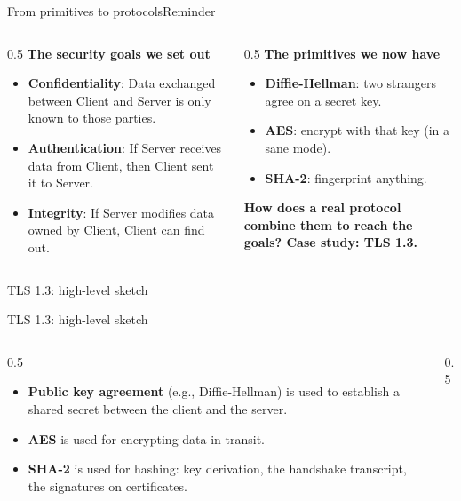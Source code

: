 \ifdefined\PRESENTATION\else\PassOptionsToClass{handout}{beamer}\fi\documentclass[aspectratio=169, lualatex]{beamer}
\begin{document}
\begin{frame}{From primitives to protocols}{Reminder}
	\begin{columns}[c]
		\begin{column}{0.5\textwidth}
			\textbf{The security goals we set out}
			\begin{itemize}
				\item \textbf{Confidentiality}: Data exchanged between Client and Server
				      is only known to those parties.
				\item \textbf{Authentication}: If Server receives data from Client,
				      then Client sent it to Server.
				\item \textbf{Integrity}: If Server modifies data owned by Client,
				      Client can find out.
			\end{itemize}
		\end{column}
		\begin{column}{0.5\textwidth}
			\textbf{The primitives we now have}
			\begin{itemize}
				\item \textbf{Diffie-Hellman}: two strangers agree on a secret key.
				\item \textbf{AES}: encrypt with that key (in a sane mode).
				\item \textbf{SHA-2}: fingerprint anything.
			\end{itemize}
			\vspace{0.3cm}
			\textcolor{cipherprimary}{\textbf{How does a real protocol combine them to reach the goals? Case study: TLS 1.3.}}
		\end{column}
	\end{columns}
\end{frame}

\begin{frame}{TLS 1.3: high-level sketch}
\end{frame}

\begin{frame}{TLS 1.3: high-level sketch}
	\begin{columns}[c]
		\begin{column}{0.5\textwidth}
			\begin{itemize}[<+->]
				\item \textbf{Public key agreement} (e.g., Diffie-Hellman) is used to establish
				      a shared secret between the client and the server.
				\item \textbf{AES} is used for encrypting data in transit.
				\item \textbf{SHA-2} is used for hashing: key derivation, the handshake transcript, the signatures on certificates.
			\end{itemize}
		\end{column}

		\begin{column}{0.5\textwidth}
		\end{column}
	\end{columns}
\end{frame}
\end{document}
